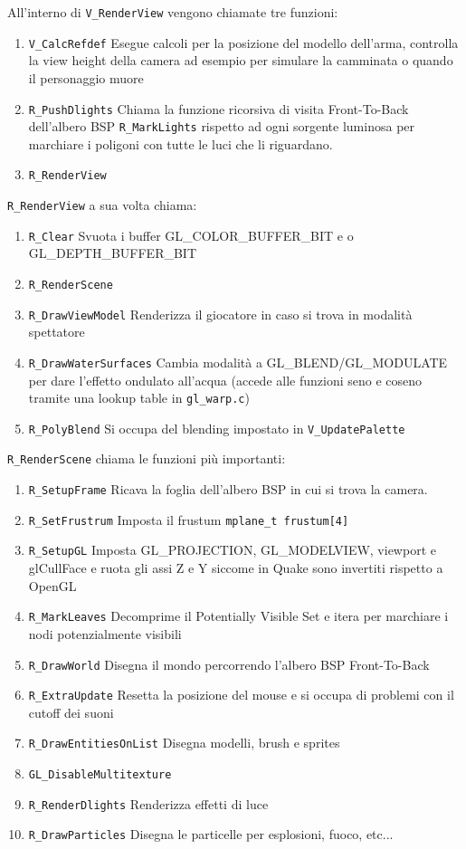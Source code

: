 \documentclass[12pt, letterpaper]{article}
\begin{document}
All'interno di \texttt{V\_RenderView} vengono chiamate tre funzioni:
\begin{enumerate}
\item \texttt{V\_CalcRefdef} Esegue calcoli per la posizione del modello dell'arma, controlla la view height della camera ad esempio per simulare la camminata o quando il personaggio muore
\item \texttt{R\_PushDlights} Chiama la funzione ricorsiva di visita Front-To-Back dell'albero BSP \texttt{R\_MarkLights} rispetto ad ogni sorgente luminosa per marchiare i poligoni con tutte le luci che li riguardano.
\item \texttt{R\_RenderView}
\end{enumerate}


\texttt{R\_RenderView} a sua volta chiama:
\begin{enumerate}
\item \texttt{R\_Clear} Svuota i buffer GL\_COLOR\_BUFFER\_BIT e o GL\_DEPTH\_BUFFER\_BIT
\item \texttt{R\_RenderScene} 
\item \texttt{R\_DrawViewModel} Renderizza il giocatore in caso si trova in modalità spettatore
\item \texttt{R\_DrawWaterSurfaces} Cambia modalità a GL\_BLEND/GL\_MODULATE per dare l'effetto ondulato all'acqua (accede alle funzioni seno e coseno tramite una lookup table in \texttt{gl\_warp.c})
\item \texttt{R\_PolyBlend} Si occupa del blending impostato in \texttt{V\_UpdatePalette}
\end{enumerate}

\texttt{R\_RenderScene} chiama le funzioni più importanti:
\begin{enumerate}
\item \texttt{R\_SetupFrame} Ricava la foglia dell'albero BSP in cui si trova la camera.
\item \texttt{R\_SetFrustrum} Imposta il frustum \texttt{mplane\_t frustum[4]}
\item \texttt{R\_SetupGL} Imposta GL\_PROJECTION, GL\_MODELVIEW, viewport e glCullFace e ruota gli assi Z e Y siccome in Quake sono invertiti rispetto a OpenGL
\item \texttt{R\_MarkLeaves} Decomprime il Potentially Visible Set e itera per marchiare i nodi potenzialmente visibili
\item \texttt{R\_DrawWorld} Disegna il mondo percorrendo l'albero BSP Front-To-Back
\item \texttt{R\_ExtraUpdate} Resetta la posizione del mouse e si occupa di problemi con il cutoff dei suoni
\item \texttt{R\_DrawEntitiesOnList} Disegna modelli, brush e sprites
\item \texttt{GL\_DisableMultitexture} 
\item \texttt{R\_RenderDlights} Renderizza effetti di luce
\item \texttt{R\_DrawParticles} Disegna le particelle per esplosioni, fuoco, etc...
  \end{enumerate}
  \cite{sanglard2013quake}
\end{document}
